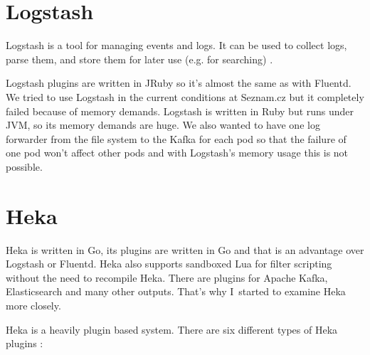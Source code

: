 \section{Logstash}
Logstash is a tool for managing events and logs. It can be used to collect logs, parse them, and store them for later use (e.g. for searching) \cite{logstash}.
 
Logstash plugins are written in JRuby so it’s almost the same as with Fluentd. We tried to use Logstash in the current conditions at Seznam.cz but it completely failed because of memory demands. Logstash is written in Ruby but runs under JVM, so its memory demands are huge. We also wanted to have one log forwarder from the file system to the Kafka for each pod so that the failure of one pod won’t affect other pods and with Logstash’s memory usage this is not possible.
    
\section{Heka}
Heka \cite{heka} is written in Go, its plugins are written in Go and that is an advantage over Logstash or Fluentd. Heka also supports sandboxed Lua for filter scripting without the need to recompile Heka. There are plugins for Apache Kafka, Elasticsearch and many other outputs. That’s why I~started to examine Heka more closely.

Heka is a heavily plugin based system. There are six different types of Heka plugins \cite{heka}:

